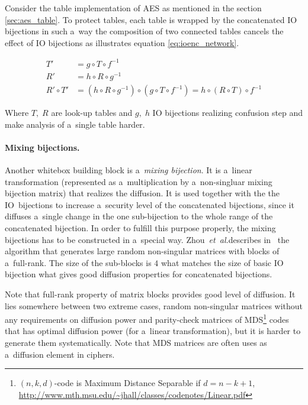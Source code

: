 \documentclass[11pt,oneside,final]{fithesis2}
\newcommand{\eal}{\emph{et~al.}}
\begin{document}
    Consider the table implementation of AES as mentioned in the section \ref{sec:aes_table}. To protect tables, each table is wrapped by
    the concatenated IO bijections in such a~way the composition of two connected tables cancels the effect of IO bijections as illustrates  
    equation \ref{eq:ioenc_network}.
    
    \begin{subequations}\label{eq:ioenc_network}
    \begin{align}
        T' &= g \circ T \circ f^{-1} \\
        R' &= h \circ R \circ g^{-1} \\
        R' \circ T' &= \left(h \circ R \circ g^{-1}\right) \circ \left(g \circ T \circ f^{-1}\right) = h \circ (R \circ T) \circ f^{-1}
    \end{align}
    \end{subequations}
    
    Where $T,\; R$ are look-up tables and $g,\; h$ IO bijections realizing confusion step and make analysis of a~single table harder.
    
    \paragraph*{Mixing bijections.}
    Another whitebox building block is a~\emph{mixing bijection}. It is a~linear transformation (represented as a~multiplication by a~non-singluar mixing bijection matrix)
    that realizes the diffusion. It is used together with the the IO~bijections to increase a~security level of the concatenated bijections, since it diffuses a~single change
    in the one sub-bijection to the whole range of the concatenated bijection. In order to fulfill this purpose properly, the mixing bijections has to be constructed
    in a~special way. Zhou~\eal describes in~\citep{journals/iacr/XiaoZ02} the algorithm that generates large random non-singular matrices with blocks of a~full-rank.
    The size of the sub-blocks is $4$ what matches the size of basic IO bijection what gives good diffusion properties for concatenated bijections. 
    
    Note that full-rank property of matrix blocks provides good level of diffusion. It lies somewhere between two extreme cases, random non-singular matrices without any
    requirements on diffusion power and parity-check matrices of MDS\footnote{$(n, k, d)$-code is Maximum Distance Separable if $d=n-k+1$, \url{http://www.mth.msu.edu/~jhall/classes/codenotes/Linear.pdf}} 
    codes that has optimal diffusion power (for a~linear transformation), but it is harder to generate them systematically. Note that MDS matrices are often uses 
    as a~diffusion element in ciphers.
    
\end{document}
